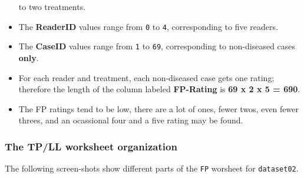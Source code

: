 \documentclass[]{book}
\begin{document}
\begin{itemize}
 to two treatments.
\item
  The \textbf{ReaderID} values range from \texttt{0} to \texttt{4}, corresponding to five readers.
\item
  The \textbf{CaseID} values range from \texttt{1} to \texttt{69}, corresponding to non-diseased cases \textbf{only}.
\item
  For each reader and treatment, each non-diseased case gets one rating; therefore the length of the column labeled \textbf{FP-Rating} is \textbf{69 x 2 x 5 = 690}.
\item
  The FP ratings tend to be low, there are a lot of ones, fewer twos, even fewer threes, and an ocassional four and a five rating may be found.
\end{itemize}

\hypertarget{the-tpll-worksheet-organization}{%
\subsubsection{The TP/LL worksheet organization}\label{the-tpll-worksheet-organization}}

The following screen-shots show different parts of the \texttt{FP} worsheet for \texttt{dataset02}.
\end{document}
